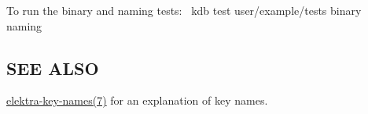 To run the {\ttfamily binary} and {\ttfamily naming} tests\+:~\newline
 {\ttfamily kdb test user/example/tests binary naming}~\newline


\subsection*{S\+EE A\+L\+SO}


\begin{DoxyItemize}
\item \hyperlink{md_doc_help_elektra-key-names_doc_help_elektra-key-names_md}{elektra-\/key-\/names(7)} for an explanation of key names. 
\end{DoxyItemize}